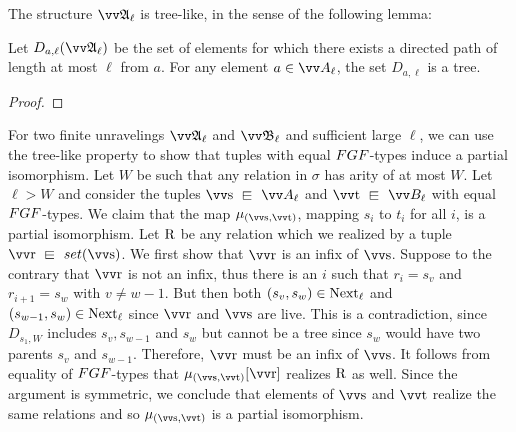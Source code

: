 \noindent
The structure $\unravel{A}_{\ell}$ is tree-like, in the sense of the following lemma:
\begin{lemma}\label{lem:companion-tree-like}
  Let $D_{a, \ell}(\unravel{A}_{\ell})$ be the set of elements for which there exists a directed path of length at most $\ell$ from $a$.
  For any element $a \in \unraveldom{A}_{\ell}$, the set $D_{a, \ell}$ is a tree.
\end{lemma}
\begin{proof}
\end{proof}
For two finite unravelings $\unravel{A}_{\ell}$ and $\unravel{B}_{\ell}$ and sufficient large $\ell$, we can use the tree-like property to show that tuples with equal $\FGF$-types induce a partial isomorphism.
Let $W$ be such that any relation in $\sigma$ has arity of at most $W$.
Let $\ell > W$ and consider the tuples $\elemtuptuples \sqin \unraveldom{A}_{\ell}$ and $\elemtuptuplet \sqin \unraveldom{B}_{\ell}$ with equal $\FGF$-types.
We claim that the map $\mu_{(\elemtuptuples, \elemtuptuplet)}$, mapping $s_{i}$ to $t_{i}$ for all $i$, is a partial isomorphism.
Let $\mathrm{R}$ be any relation which we realized by a tuple $\elemtuptupler \sqin \set(\elemtuptuples)$.
We first show that $\elemtuptupler$ is an infix of $\elemtuptuples$.
Suppose to the contrary that $\elemtuptupler$ is not an infix, thus there is an $i$ such that $r_{i} = s_{v}$ and $r_{i+1} = s_{w}$ with $v \ne w - 1$.
But then both $(s_{v}, s_{w}) \in \mathrm{Next}_{\ell}$ and $(s_{w-1}, s_{w}) \in \mathrm{Next}_{\ell}$ since $\elemtuptupler$ and $\elemtuptuples$ are live.
This is a contradiction, since $D_{s_{1}, W}$ includes $s_{v}, s_{w-1}$ and $s_{w}$ but cannot be a tree since $s_{w}$ would have two parents $s_{v}$ and $s_{w-1}$.
Therefore, $\elemtuptupler$ must be an infix of $\elemtuptuples$.
It follows from equality of $\FGF$-types that $\mu_{(\elemtuptuples, \elemtuptuplet)}[\elemtuptupler]$ realizes $\mathrm{R}$ as well.
Since the argument is symmetric, we conclude that elements of $\elemtuptuples$ and $\elemtuptuplet$ realize the same relations and so $\mu_{(\elemtuptuples, \elemtuptuplet)}$ is a partial isomorphism.


